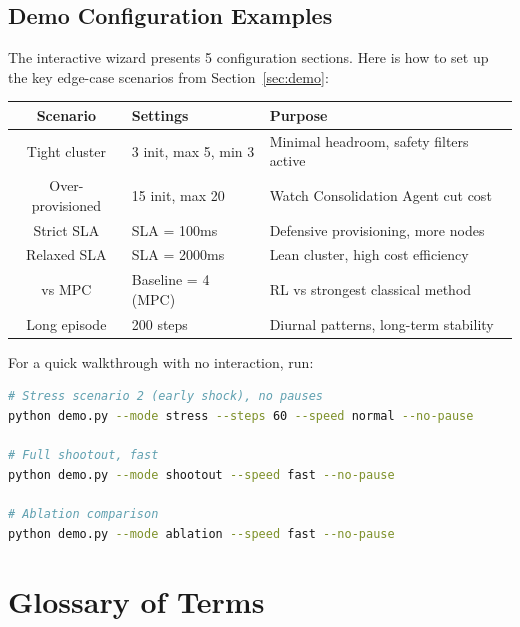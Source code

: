 \documentclass[11pt,a4paper]{article}
\begin{document}
\subsection{Demo Configuration Examples}

The interactive wizard presents 5 configuration sections.
Here is how to set up the key edge-case scenarios from Section~\ref{sec:demo}:

\begin{center}
\begin{tabular}{clp{6cm}}
\toprule
\textbf{Scenario} & \textbf{Settings} & \textbf{Purpose} \\
\midrule
Tight cluster & 3 init, max 5, min 3 & Minimal headroom, safety filters active \\
Over-provisioned & 15 init, max 20 & Watch Consolidation Agent cut cost \\
Strict SLA & SLA = 100ms & Defensive provisioning, more nodes \\
Relaxed SLA & SLA = 2000ms & Lean cluster, high cost efficiency \\
vs MPC & Baseline = 4 (MPC) & RL vs strongest classical method \\
Long episode & 200 steps & Diurnal patterns, long-term stability \\
\bottomrule
\end{tabular}
\end{center}

For a quick walkthrough with no interaction, run:
\begin{lstlisting}[language=bash]
# Stress scenario 2 (early shock), no pauses
python demo.py --mode stress --steps 60 --speed normal --no-pause

# Full shootout, fast
python demo.py --mode shootout --speed fast --no-pause

# Ablation comparison
python demo.py --mode ablation --speed fast --no-pause
\end{lstlisting}


\section{Glossary of Terms}
\end{document}
